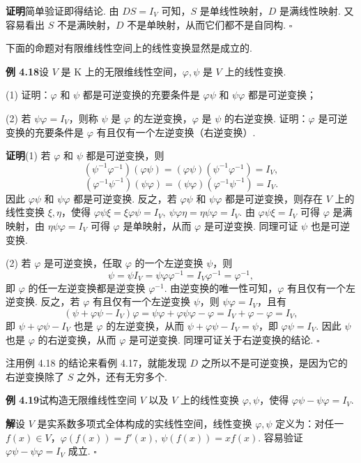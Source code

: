 \documentclass[UTF8, 12pt, fontset=fandol, oneside]{ctexart}
\begin{document}
\noindent\textbf{证明}\quad 简单验证即得结论. 由 $DS=I_V$ 可知，$S$ 是单线性映射，$D$ 是满线性映射. 又容易看出 $S$ 不是满映射，$D$ 不是单映射，从而它们都不是自同构. $\square$

下面的命题对有限维线性空间上的线性变换显然是成立的.

\noindent\textbf{例 4.18}\quad 设 $V$ 是 $\mathrm{K}$ 上的无限维线性空间，$\varphi,\psi$ 是 $V$ 上的线性变换.

(1) 证明：$\varphi$ 和 $\psi$ 都是可逆变换的充要条件是 $\varphi\psi$ 和 $\psi\varphi$ 都是可逆变换；

(2) 若 $\psi\varphi=I_V$，则称 $\psi$ 是 $\varphi$ 的左逆变换，$\varphi$ 是 $\psi$ 的右逆变换. 证明：$\varphi$ 是可逆变换的充要条件是 $\varphi$ 有且仅有一个左逆变换（右逆变换）.

\noindent\textbf{证明}\quad (1) 若 $\varphi$ 和 $\psi$ 都是可逆变换，则
\[
(\psi^{-1}\varphi^{-1})(\varphi\psi)=(\varphi\psi)(\psi^{-1}\varphi^{-1})=I_V,
\]
\[
(\varphi^{-1}\psi^{-1})(\psi\varphi)=(\psi\varphi)(\varphi^{-1}\psi^{-1})=I_V.
\]
因此 $\varphi\psi$ 和 $\psi\varphi$ 都是可逆变换. 反之，若 $\varphi\psi$ 和 $\psi\varphi$ 都是可逆变换，则存在 $V$ 上的线性变换 $\xi,\eta$，使得 $\varphi\psi\xi=\xi\varphi\psi=I_V,\ \psi\varphi\eta=\eta\psi\varphi=I_V$. 由 $\varphi\psi\xi=I_V$ 可得 $\varphi$ 是满映射，由 $\eta\psi\varphi=I_V$ 可得 $\varphi$ 是单映射，从而 $\varphi$ 是可逆变换. 同理可证 $\psi$ 也是可逆变换.

(2) 若 $\varphi$ 是可逆变换，任取 $\varphi$ 的一个左逆变换 $\psi$，则
\[
\psi=\psi I_V=\psi\varphi\varphi^{-1}=I_V\varphi^{-1}=\varphi^{-1},
\]
即 $\varphi$ 的任一左逆变换都是逆变换 $\varphi^{-1}$. 由逆变换的唯一性可知，$\varphi$ 有且仅有一个左逆变换. 反之，若 $\varphi$ 有且仅有一个左逆变换 $\psi$，则 $\psi\varphi=I_V$，且有
\[
(\psi+\varphi\psi-I_V)\varphi=\psi\varphi+\varphi\psi\varphi-\varphi=I_V+\varphi-\varphi=I_V,
\]
即 $\psi+\varphi\psi-I_V$ 也是 $\varphi$ 的左逆变换，从而 $\psi+\varphi\psi-I_V=\psi$，即 $\varphi\psi=I_V$. 因此 $\psi$ 也是 $\varphi$ 的右逆变换，从而 $\varphi$ 是可逆变换. 同理可证关于右逆变换的结论. $\square$

注\quad 用例 4.18 的结论来看例 4.17，就能发现 $D$ 之所以不是可逆变换，是因为它的右逆变换除了 $S$ 之外，还有无穷多个.

\noindent\textbf{例 4.19}\quad 试构造无限维线性空间 $V$ 以及 $V$ 上的线性变换 $\varphi,\psi$，使得 $\varphi\psi-\psi\varphi=I_V$.

\noindent\textbf{解}\quad 设 $V$ 是实系数多项式全体构成的实线性空间，线性变换 $\varphi,\psi$ 定义为：对任一 $f(x)\in V$，$\varphi(f(x))=f'(x),\ \psi(f(x))=xf(x)$. 容易验证 $\varphi\psi-\psi\varphi=I_V$ 成立. $\square$
\end{document}
